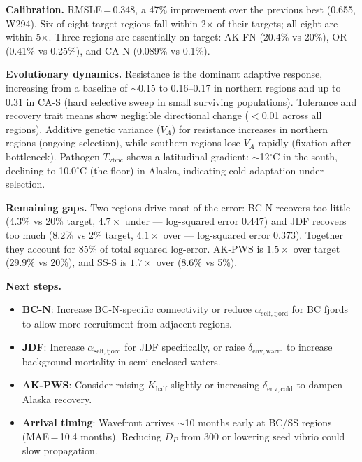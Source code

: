 \documentclass[11pt,letterpaper]{article}
\begin{document}
\textbf{Calibration.}
RMSLE\,=\,0.348, a 47\% improvement over the previous best (0.655, W294).
Six of eight target regions fall within 2$\times$ of their targets; all eight are within 5$\times$.
Three regions are essentially on target: AK-FN (20.4\% vs 20\%), OR (0.41\% vs 0.25\%), and CA-N (0.089\% vs 0.1\%).

\textbf{Evolutionary dynamics.}
Resistance is the dominant adaptive response, increasing from a baseline of $\sim$0.15 to 0.16--0.17 in northern regions and up to 0.31 in CA-S (hard selective sweep in small surviving populations).
Tolerance and recovery trait means show negligible directional change ($<$0.01 across all regions).
Additive genetic variance ($V_A$) for resistance increases in northern regions (ongoing selection), while southern regions lose $V_A$ rapidly (fixation after bottleneck).
Pathogen $T_{\mathrm{vbnc}}$ shows a latitudinal gradient: $\sim$12$^\circ$C in the south, declining to 10.0$^\circ$C (the floor) in Alaska, indicating cold-adaptation under selection.

\textbf{Remaining gaps.}
Two regions drive most of the error:
BC-N recovers too little (4.3\% vs 20\% target, $4.7\times$ under --- log-squared error 0.447) and
JDF recovers too much (8.2\% vs 2\% target, $4.1\times$ over --- log-squared error 0.373).
Together they account for 85\% of total squared log-error.
AK-PWS is $1.5\times$ over target (29.9\% vs 20\%), and SS-S is $1.7\times$ over (8.6\% vs 5\%).

\textbf{Next steps.}
\begin{itemize}[nosep,leftmargin=1.5em]
  \item \textbf{BC-N}: Increase BC-N-specific connectivity or reduce $\alpha_{\mathrm{self,fjord}}$ for BC fjords to allow more recruitment from adjacent regions.
  \item \textbf{JDF}: Increase $\alpha_{\mathrm{self,fjord}}$ for JDF specifically, or raise $\delta_{\mathrm{env,warm}}$ to increase background mortality in semi-enclosed waters.
  \item \textbf{AK-PWS}: Consider raising $K_{\mathrm{half}}$ slightly or increasing $\delta_{\mathrm{env,cold}}$ to dampen Alaska recovery.
  \item \textbf{Arrival timing}: Wavefront arrives $\sim$10 months early at BC/SS regions (MAE\,=\,10.4 months). Reducing $D_P$ from 300 or lowering seed vibrio could slow propagation.
\end{itemize}

\end{document}
